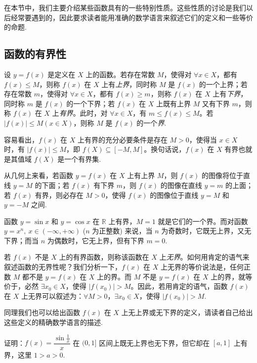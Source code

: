 在本节中，我们主要介绍某些函数具有的一些特别性质。这些性质的讨论是我们以后经常要遇到的，因此要求读者能用准确的数学语言来叙述它们的定义和一些等价的命题.

\subsection{函数的有界性}
\label{subsec:ma-1-3-1}

设 $y=f(x)$ 是定义在 $X$ 上的函数。若存在常数 $M$，使得对 $\forall x\in X$，都有 $f(x)\leqslant M$，则称 $f(x)$ 在 $X$ 上有\emph{上界}，同时称 $M$ 是 $f(x)$ 的一个上界；若存在常数 $m$，使得对 $\forall x\in X$，都有 $f(x)\geqslant m$，则称 $f(x)$ 在 $X$ 上有\emph{下界}，同时称 $m$ 是 $f(x)$ 的一个下界；若 $f(x)$ 在 $X$ 上既有上界 $M$ 又有下界 $m$，则称 $f(x)$ 在 $X$ 上\emph{有界}。此时，对 $\forall x\in X$，有 $m\leqslant f(x)\leqslant M$。若 $|f(x)|\leqslant M(x\in X)$，则称 $M$ 是 $f(x)$ 的一个\emph{界}.

容易看出，$f(x)$ 在 $X$ 上有界的充分必要条件是存在 $M>0$，使得当 $x\in X$ 时，有 $|f(x)|\leqslant M$，即 $f(X)\subseteq[-M,M]$。换句话说，$f(x)$ 在 $X$ 有界也就是其值域 $f(X)$ 是一个有界集.

从几何上来看，若函数 $y=f(x)$ 在 $X$ 上有上界 $M$，则 $f(x)$ 的图像将位于直线 $y=M$ 的下面；若 $f(x)$ 有下界 $m$，则 $f(x)$ 的图像在直线 $y=m$ 的上面；若 $f(x)$ 有界，则必存在 $M>0$，使得 $f(x)$ 的图像位于直线 $y=M$ 和 $y=-M$ 之间.

\begin{example}\label{example:ma-1-3-1}
函数 $y=\sin x$ 和 $y=\cos x$ 在 $\mathbb{R}$ 上有界，$M=1$ 就是它们的一个界。而对函数 $y=x^n,\ x\in(-\infty,+\infty)$ ($n$ 为正整数) 来说，当 $n$ 为奇数时，它既无上界，又无下界；而当 $n$ 为偶数时，它无上界，但有下界 $m=0$.
\end{example}

若 $f(x)$ 不是 $X$ 上的有界函数，则称该函数在 $X$ 上\emph{无界}。如何用肯定的语气来叙述函数的无界性呢？我们分析一下，$f(x)$ 在 $X$ 上无界的等价说法是，任何正数 $M$ 都不是 $y=f(x)$ 在 $X$ 上的界。而 $M$ 不是 $y=f(x)$ 在 $X$ 上的界，就等价于，必然 $\exists x_0\in X$，使得 $|f(x_0)|>M$。因此，若用肯定的语气，函数 $f(x)$ 在 $X$ 上无界可以叙述为：$\forall M>0$，$\exists x_0\in X$，使得 $|f(x_0)|>M$.

同理我们也可以给出函数 $f(x)$ 在 $X$ 上无上界或无下界的定义，请读者自己给出这些定义的精确数学语言的描述.

\begin{example}\label{example:ma-1-3-2}
证明：$f(x)=\dfrac{\sin\frac1x}{x}$ 在 $(0,1]$ 区间上既无上界也无下界，但它却在 $[a,1]$ 上有界，这里 $1>a>0$.
\end{example}


